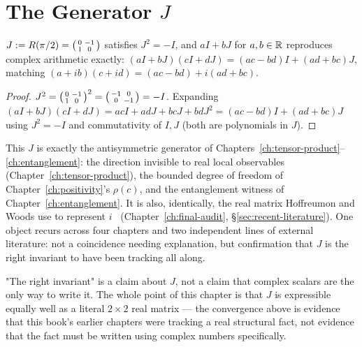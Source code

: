 \section{The Generator \texorpdfstring{$J$}{J}}

\begin{proposition}
\label{prop:quarter-turn}
$J := R(\pi/2) = \begin{psmallmatrix}0&-1\\1&0\end{psmallmatrix}$ satisfies
$J^2=-I$, and $aI+bJ$ for $a,b\in\mathbb{R}$ reproduces complex arithmetic exactly:
$(aI+bJ)(cI+dJ) = (ac-bd)I + (ad+bc)J$, matching $(a+ib)(c+id) =
(ac-bd)+i(ad+bc)$.
\end{proposition}

\begin{proof}
$J^2 = \begin{psmallmatrix}0&-1\\1&0\end{psmallmatrix}^2 =
\begin{psmallmatrix}-1&0\\0&-1\end{psmallmatrix}=-I$. Expanding
$(aI+bJ)(cI+dJ) = acI + adJ + bcJ + bdJ^2 = (ac-bd)I+(ad+bc)J$ using
$J^2=-I$ and commutativity of $I,J$ (both are polynomials in $J$).
\end{proof}

This $J$ is exactly the antisymmetric generator of
Chapters~\ref{ch:tensor-product}--\ref{ch:entanglement}: the direction
invisible to real local observables (Chapter~\ref{ch:tensor-product}), the
bounded degree of freedom of Chapter~\ref{ch:positivity}'s $\rho(c)$, and
the entanglement witness of Chapter~\ref{ch:entanglement}. It is also,
identically, the real matrix Hoffreumon and Woods use to represent
$i$~\cite{hoffreumon-woods-2025} (Chapter~\ref{ch:final-audit},
\S\ref{sec:recent-literature}). One object recurs across four chapters and
two independent lines of external literature: not a coincidence needing
explanation, but confirmation that $J$ is the right invariant to have been
tracking all along.

\begin{scopebox}
\scopetitle{}"The right invariant" is a claim about $J$, not a claim that
complex scalars are the only way to write it. The whole point of this
chapter is that $J$ is expressible equally well as a literal $2\times2$
real matrix — the convergence above is evidence that this book's earlier
chapters were tracking a real structural fact, not evidence that the fact
must be written using complex numbers specifically.
\end{scopebox}

